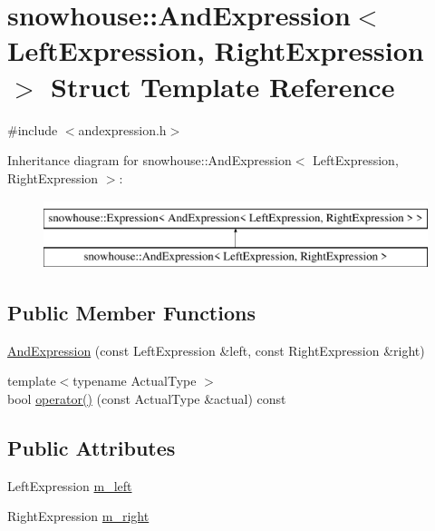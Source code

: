 \hypertarget{structsnowhouse_1_1AndExpression}{}\section{snowhouse\+::And\+Expression$<$ Left\+Expression, Right\+Expression $>$ Struct Template Reference}
\label{structsnowhouse_1_1AndExpression}


{\ttfamily \#include $<$andexpression.\+h$>$}

Inheritance diagram for snowhouse\+::And\+Expression$<$ Left\+Expression, Right\+Expression $>$\+:\begin{figure}[H]
\begin{center}
\leavevmode
\includegraphics[height=2.000000cm]{structsnowhouse_1_1AndExpression}
\end{center}
\end{figure}
\subsection*{Public Member Functions}
\begin{DoxyCompactItemize}
\item 
\mbox{\hyperlink{structsnowhouse_1_1AndExpression_a4a9dea7812d63087e993b8a5b7a3064e}{And\+Expression}} (const Left\+Expression \&left, const Right\+Expression \&right)
\item 
{\footnotesize template$<$typename Actual\+Type $>$ }\\bool \mbox{\hyperlink{structsnowhouse_1_1AndExpression_a1db2b9dff5519ca891b992db3eae314e}{operator()}} (const Actual\+Type \&actual) const
\end{DoxyCompactItemize}
\subsection*{Public Attributes}
\begin{DoxyCompactItemize}
\item 
Left\+Expression \mbox{\hyperlink{structsnowhouse_1_1AndExpression_a4ae9b17cc0abac75463b2b8308ed93b2}{m\+\_\+left}}
\item 
Right\+Expression \mbox{\hyperlink{structsnowhouse_1_1AndExpression_ae3d3890df4b6d0b8648ddc8e1f15e857}{m\+\_\+right}}
\end{DoxyCompactItemize}


